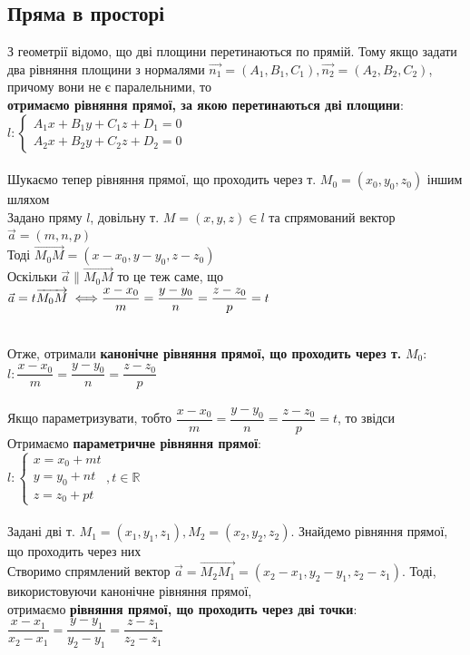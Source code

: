 \documentclass[a4paper, 14pt]{extarticle}
\def\bigline{\vspace{5mm}\\}
\begin{document}
\subsection{Пряма в просторі}
З геометрії відомо, що дві площини перетинаються по прямій. Тому якщо задати два рівняння площини з нормалями $\vec{n_1} = (A_1,B_1,C_1), \vec{n_2} = (A_2,B_2,C_2)$, причому вони не є паралельними, то\\
\textbf{отримаємо рівняння прямої, за якою перетинаються дві площини}:\\
$l: \begin{cases}
A_1x + B_1y + C_1z + D_1 = 0 \\
A_2x + B_2y + C_2z + D_2 = 0
\end{cases}
$
\\
\bigline
Шукаємо тепер рівняння прямої, що проходить через т. $M_0 = (x_0, y_0,z_0)$ іншим шляхом\\
Задано пряму $l$, довільну т. $M = (x,y,z) \in l$ та спрямований вектор $\vec{a} = (m,n,p)$\\
Тоді $\overrightarrow{M_0M} = (x-x_0, y-y_0, z-z_0)$\\
Оскільки $\vec{a} \parallel \overrightarrow{M_0M}$ то це теж саме, що $\vec{a} = t \overrightarrow{M_0 M} \iff \\
\dfrac{x-x_0}{m} = \dfrac{y-y_0}{n} = \dfrac{z-z_0}{p} = t$\\
\\
Отже, отримали \textbf{канонічне рівняння прямої, що проходить через т.} $M_0$:\\
$l: \dfrac{x-x_0}{m} = \dfrac{y-y_0}{n} = \dfrac{z-z_0}{p}$\\
\bigline
Якщо параметризувати, тобто $\dfrac{x-x_0}{m} = \dfrac{y-y_0}{n} = \dfrac{z-z_0}{p} = t$, то звідси\\
Отримаємо \textbf{параметричне рівняння прямої}:\\
$l: \begin{cases}
x = x_0 + mt\\
y = y_0 + nt\\
z = z_0 + pt
\end{cases}, t \in \mathbb{R}
$
\bigline
\\
Задані дві т. $M_1 = (x_1,y_1,z_1), M_2 = (x_2,y_2,z_2)$. Знайдемо рівняння прямої, що проходить через них\\
Створимо спрямлений вектор $\vec{a} = \overrightarrow{M_2M_1} = (x_2-x_1,y_2-y_1,z_2-z_1)$. Тоді, використовуючи канонічне рівняння прямої,\\
отримаємо \textbf{рівняння прямої, що проходить через дві точки}:\\
$\dfrac{x-x_1}{x_2-x_1} = \dfrac{y-y_1}{y_2-y_1} = \dfrac{z-z_1}{z_2-z_1}$
\bigline
\end{document}
